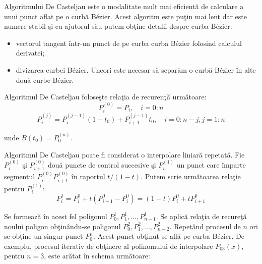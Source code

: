\documentclass{exam}
\begin{document}
Algoritmului De Casteljau este o modalitate mult mai eficientă de calculare a unui punct aflat pe o curbă B\'{e}zier. Acest algoritm este puţin mai lent dar este numerc stabil şi cu ajutorul său putem obţine detalii despre curba B\'{e}zier:
\begin{itemize}
	\item vectorul tangent într-un punct de pe curba curba B\'{e}zier folosind calculul derivatei;
	\item divizarea curbei B\'{e}zier. Uneori este necesar să separăm o curbă B\'{e}zier în alte două curbe B\'{e}zier.
\end{itemize}

Algoritmul De Casteljau foloseşte relaţia de recurenţă următoare:
$$P_i^{(0)} = P_i, \quad i = 0 : n$$
$$P_i^{(j)} = P_i^{(j-1)}(1 - t_0) + P_{i+1}^{(j-1)}t_0, \quad i = 0 : n-j,j = 1 : n$$

\noindent unde $ B(t_0) = P_0^{(n)}$.

Algoritmul De Casteljau poate fi considerat o interpolare liniară repetată. Fie $P_i^{(0)}$ şi $P_{i+1}^{(0)}$ două puncte de control succesive şi $ P_i^{(1)}$ un punct care împarte segmentul $P_i^{(0)}P_{i+1}^{(0)}$ în raportul $t/(1-t)$. Putem scrie  următoarea relaţie pentru $P_i^{(1)}$: $$P_i^{1} = P_i^{0}+t(P_{i+1}^{0} - P_i^{0}) = (1 - t)P_i^{0} + tP_{i+1}^{0}$$

Se formează în acest fel poligonul $P_0^{1}, P_1^{1},..., P_{n-1}^{1}$. Se aplică relaţia de recureţă noului poligon obţinându-se poligonul $P_0^{2}, P_1^{2}, ..., P_{n-2}^{2}$. Repetând procesul de $n$ ori se obţine un singur punct $P_0^{n}$. Acest punct obţinut se află pe curba B\'{e}zier.
De exemplu, procesul iterativ de obţinere al polinomului de interpolare $P_{03}(x)$, pentru $n=3$, este arătat în schema următoare:
\end{document}
